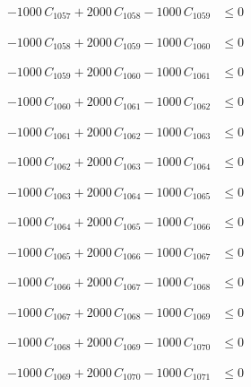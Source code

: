 \documentclass[a4paper,11pt]{article}
\begin{document}
\begin{align}
-1000\,C_{1057} + 2000\,C_{1058} - 1000\,C_{1059} &\leq 0 \nonumber
\end{align}

\begin{align}
-1000\,C_{1058} + 2000\,C_{1059} - 1000\,C_{1060} &\leq 0 \nonumber
\end{align}

\begin{align}
-1000\,C_{1059} + 2000\,C_{1060} - 1000\,C_{1061} &\leq 0 \nonumber
\end{align}

\begin{align}
-1000\,C_{1060} + 2000\,C_{1061} - 1000\,C_{1062} &\leq 0 \nonumber
\end{align}

\begin{align}
-1000\,C_{1061} + 2000\,C_{1062} - 1000\,C_{1063} &\leq 0 \nonumber
\end{align}

\begin{align}
-1000\,C_{1062} + 2000\,C_{1063} - 1000\,C_{1064} &\leq 0 \nonumber
\end{align}

\begin{align}
-1000\,C_{1063} + 2000\,C_{1064} - 1000\,C_{1065} &\leq 0 \nonumber
\end{align}

\begin{align}
-1000\,C_{1064} + 2000\,C_{1065} - 1000\,C_{1066} &\leq 0 \nonumber
\end{align}

\begin{align}
-1000\,C_{1065} + 2000\,C_{1066} - 1000\,C_{1067} &\leq 0 \nonumber
\end{align}

\begin{align}
-1000\,C_{1066} + 2000\,C_{1067} - 1000\,C_{1068} &\leq 0 \nonumber
\end{align}

\begin{align}
-1000\,C_{1067} + 2000\,C_{1068} - 1000\,C_{1069} &\leq 0 \nonumber
\end{align}

\begin{align}
-1000\,C_{1068} + 2000\,C_{1069} - 1000\,C_{1070} &\leq 0 \nonumber
\end{align}

\begin{align}
-1000\,C_{1069} + 2000\,C_{1070} - 1000\,C_{1071} &\leq 0 \nonumber
\end{align}
\end{document}

